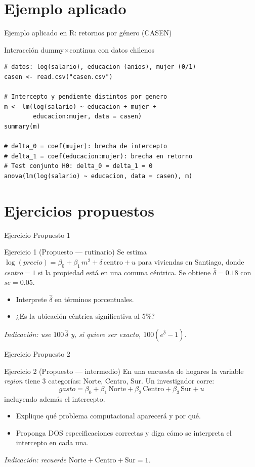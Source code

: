 \documentclass{beamer}
\begin{document}
\section{Ejemplo aplicado}

\begin{frame}[fragile]{Ejemplo aplicado en R: retornos por género (CASEN)}
\begin{exampleblock}{Interacción dummy$\times$continua con datos chilenos}
\begin{verbatim}
# datos: log(salario), educacion (anios), mujer (0/1)
casen <- read.csv("casen.csv")

# Intercepto y pendiente distintos por genero
m <- lm(log(salario) ~ educacion + mujer +
        educacion:mujer, data = casen)
summary(m)

# delta_0 = coef(mujer): brecha de intercepto
# delta_1 = coef(educacion:mujer): brecha en retorno
# Test conjunto H0: delta_0 = delta_1 = 0
anova(lm(log(salario) ~ educacion, data = casen), m)
\end{verbatim}
\end{exampleblock}
\end{frame}

\section{Ejercicios propuestos}

\begin{frame}{Ejercicio Propuesto 1}
\begin{block}{Ejercicio 1 (Propuesto — rutinario)}
Se estima $\log(precio)=\beta_0+\beta_1\,m^2+\delta\,\text{centro}+u$ para viviendas en Santiago, donde \textit{centro}$=1$ si la propiedad está en una comuna céntrica. Se obtiene $\hat\delta=0.18$ con $se=0.05$.
\begin{itemize}
    \item Interprete $\hat\delta$ en términos porcentuales.
    \item ¿Es la ubicación céntrica significativa al 5\%?
\end{itemize}
\end{block}
{\small \textit{Indicación: use $100\,\hat\delta$ y, si quiere ser exacto, $100(e^{\hat\delta}-1)$.}}
\end{frame}

\begin{frame}{Ejercicio Propuesto 2}
\begin{block}{Ejercicio 2 (Propuesto — intermedio)}
En una encuesta de hogares la variable \textit{region} tiene 3 categorías: Norte, Centro, Sur. Un investigador corre:
\[
gasto = \beta_0 + \beta_1\,\text{Norte}+\beta_2\,\text{Centro}+\beta_3\,\text{Sur}+u
\]
incluyendo además el intercepto.
\begin{itemize}
    \item Explique qué problema computacional aparecerá y por qué.
    \item Proponga DOS especificaciones correctas y diga cómo se interpreta el intercepto en cada una.
\end{itemize}
\end{block}
{\small \textit{Indicación: recuerde $\text{Norte}+\text{Centro}+\text{Sur}=1$.}}
\end{frame}
\end{document}
